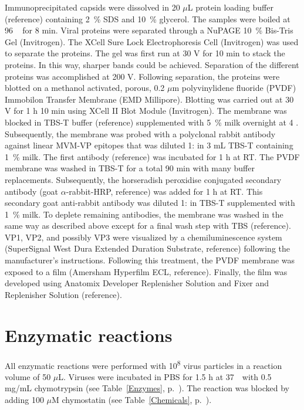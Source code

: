 Immunoprecipitated capsids were dissolved in 20 $\mu$L protein loading buffer (reference) containing 2~\% SDS and 10~\% glycerol. The samples were boiled at 96 \textcelsius~ for 8 min. Viral proteins were separated through a NuPAGE\textsuperscript{\textregistered} 10~\% Bis-Tris Gel (Invitrogen). The XCell Sure Lock\textsuperscript{\texttrademark} Electrophoresis Cell (Invitrogen) was used to separate the proteins. The gel was first run at 30 V for 10 min to stack the proteins. In this way, sharper bands could be achieved. Separation of the different proteins was accomplished at 200 V. Following separation, the proteins were blotted on a methanol activated, porous, 0.2 $\mu$m polyvinylidene fluoride (PVDF) Immobilon\textsuperscript{\textregistered} Transfer Membrane (EMD Millipore). Blotting was carried out at 30 V for 1 h 10 min using XCell II\textsuperscript{\texttrademark} Blot Module (Invitrogen). 
The membrane was blocked in TBS-T buffer (reference) supplemented with 5~\% milk overnight at 4 \textcelsius. Subsequently, the membrane was probed with a polyclonal rabbit antibody against linear MVM-VP epitopes that was diluted 1: in 3 mL TBS-T containing 1~\% milk. The first antibody (reference) was incubated for 1 h at RT. The PVDF membrane was washed in TBS-T for a total 90 min with many buffer replacements. Subsequently, the horseradish peroxidise conjugated secondary antibody (goat $\alpha$-rabbit-HRP, reference) was added for 1 h at RT. This secondary goat anti-rabbit antibody was diluted 1: in TBS-T supplemented with 1~\% milk. To deplete remaining antibodies, the membrane was washed in the same way as described above except for a final wash step with TBS (reference). VP1, VP2, and possibly VP3 were visualized by a chemiluminescence system (SuperSignal West Dura Extended Duration Substrate, reference) following the manufacturer’s instructions. Following this treatment, the PVDF membrane was exposed to a film (Amersham Hyperfilm\textsuperscript{\texttrademark} ECL, reference). Finally, the film was developed using Anatomix Developer Replenisher Solution and Fixer and Replenisher Solution (reference).

\section{Enzymatic reactions}
 
All enzymatic reactions were performed with 10\textsuperscript{8} virus particles in a reaction volume of 50 $\mu$L. Viruses were incubated in PBS for 1.5 h at 37~\textcelsius~with 0.5 mg/mL chymotrypsin (see Table~\ref{Enzymes}, p.~\pageref{Enzymes}). The reaction was blocked by adding 100 $\mu$M chymostatin (see Table~\ref{Chemicals}, p.~\pageref{Chemicals}). 

